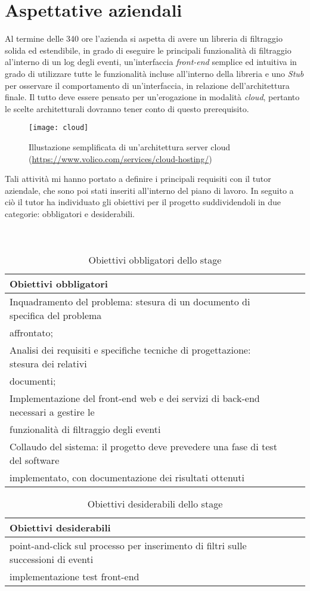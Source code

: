 \section{Aspettative aziendali}
Al termine delle 340 ore l'azienda si aspetta di avere un libreria di filtraggio solida ed estendibile, in grado di eseguire le principali funzionalità di filtraggio al'interno di un log degli eventi, un'interfaccia \textit{front-end} semplice ed intuitiva in grado di utilizzare tutte le funzionalità incluse all'interno della libreria e uno \textit{Stub} per osservare il comportamento di un'interfaccia, in relazione dell'architettura finale.
Il tutto deve essere pensato per un’erogazione in modalità \textit{cloud}, pertanto le scelte architetturali dovranno tener conto di questo prerequisito.
\begin{figure}[!h] 
	\centering 
	\texttt{[image: cloud]} 
	\caption{Illustazione semplificata di un'architettura server cloud (\url{https://www.volico.com/services/cloud-hosting/})}
\end{figure}
Tali attività mi hanno portato a definire i principali requisiti con il tutor aziendale, che sono poi stati inseriti all'interno del piano di lavoro. In seguito a ciò il tutor ha individuato gli obiettivi per il progetto suddividendoli in due categorie: obbligatori e desiderabili.\\
\\
\\
\begin{table}[!h]
	\caption{Obiettivi obbligatori dello stage}
\begin{tabularx}{\textwidth}{lXl}
	\hline\hline
	\textbf{Obiettivi obbligatori}\\
	\hline
	Inquadramento del problema: stesura di un documento di specifica del problema\\
	affrontato; &  \\
	\hline
	\hline
     Analisi dei requisiti e specifiche tecniche di progettazione: stesura dei relativi\\
     documenti; &  \\
	\hline
	\hline
	Implementazione del front-end web e dei servizi di back-end necessari a gestire le\\
	funzionalità di filtraggio degli eventi &  \\
	\hline
	\hline
	Collaudo del sistema: il progetto deve prevedere una fase di test del software\\
	implementato, con documentazione dei risultati ottenuti &  \\
	\hline	
\end{tabularx}
\end{table}
\begin{table}[!h]
	\caption{Obiettivi desiderabili dello stage}
	\begin{tabularx}{\textwidth}{lXl}
		\hline\hline
		\textbf{Obiettivi desiderabili}\\
		\hline
		point-and-click sul processo per inserimento di filtri sulle successioni di eventi&  \\
		\hline
		\hline
		implementazione test front-end &  \\
		\hline
	\end{tabularx}
\end{table}
\newpage
